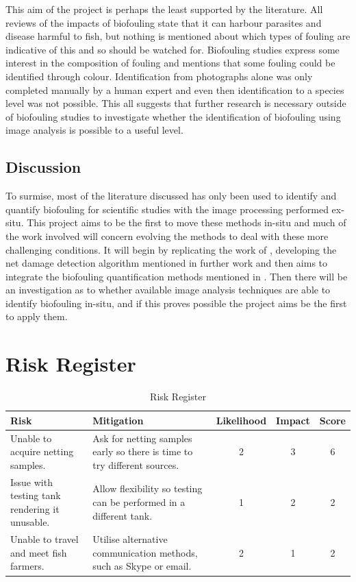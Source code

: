 \documentclass[11.5pt, twoside, a4paper]{article}
\begin{document}
This aim of the project is perhaps the least supported by the literature. All reviews of the impacts of biofouling \cite{beveridge2008cage,braithwaite2004marine,fitridge2012impact} state that it can harbour parasites and disease harmful to fish, but nothing is mentioned about which types of fouling are indicative of this and so should be watched for. Biofouling studies express some interest in the composition of fouling and \cite{hodson1995situ} mentions that some fouling could be identified through colour. Identification from photographs alone \cite{edwards2015effectiveness,guenther2010development} was only completed manually by a human expert and even then identification to a species level was not possible. This all suggests that further research is necessary outside of biofouling studies to investigate whether the identification of biofouling using image analysis is possible to a useful level.

\subsection{Discussion}

To surmise, most of the literature discussed has only been used to identify and quantify biofouling for scientific studies with the image processing performed ex-situ. This project aims to be the first to move these methods in-situ and much of the work involved will concern evolving the methods to deal with these more challenging conditions. It will begin by replicating the work of \cite{jakobsen2011automatic}, developing the net damage detection algorithm mentioned in further work and then aims to integrate the biofouling quantification methods mentioned in \cite{hodson1995situ,guenther2010development}. Then there will be an investigation as to whether available image analysis techniques are able to identify biofouling in-situ, and if this proves possible the project aims be the first to apply them.

\section{Risk Register}

\begin{table}[h]
\centering 
\begin{tabular}{|p{4.5cm}|p{5cm} |c |c| c|} \hline
Risk & Mitigation & Likelihood & Impact & Score \\ [0.5ex] 
\hline 
Unable to acquire netting samples. & Ask for netting samples early so there is time to try different sources. & 2 & 3 & 6\\
\hline
Issue with testing tank rendering it unusable. & Allow flexibility so testing can be performed in a different tank. & 1 & 2 & 2\\
\hline
Unable to travel and meet fish farmers. & Utilise alternative communication methods, such as Skype or email. & 2 & 1 & 2\\
\hline
\end{tabular}
\label{table:risks} 
\caption{Risk Register} 
\end{table}
\end{document}
